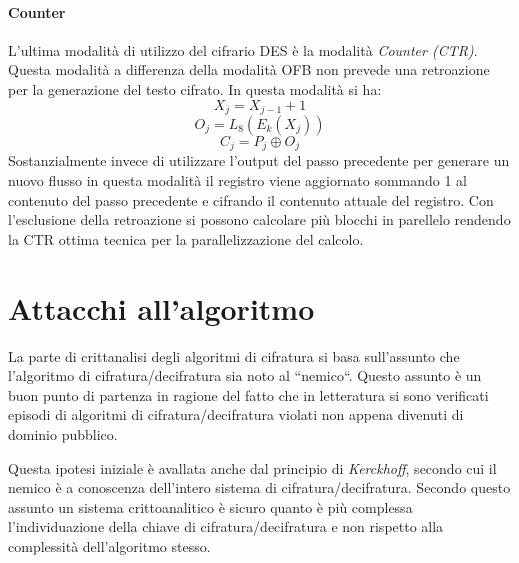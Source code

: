 \documentclass[11pt, a4paper, oneside]{Thesis} %
\begin{document}
\paragraph{Counter} L'ultima modalità di utilizzo del cifrario DES è la modalità \textit{Counter (CTR)}. Questa modalità a differenza della modalità OFB non prevede una retroazione
per la generazione del testo cifrato. In questa modalità si ha:
\[ X_j = X_{j-1}+1 \]
\[ O_j = L_8(E_k(X_j))\]
\[ C_j = P_j \oplus O_j\]
Sostanzialmente invece di utilizzare l'output del passo precedente per generare un nuovo flusso in questa modalità il registro viene aggiornato sommando 1 al contenuto
del passo precedente e cifrando il contenuto attuale del registro. Con l'esclusione della retroazione si possono calcolare più blocchi in parellelo rendendo la CTR 
ottima tecnica per la parallelizzazione del calcolo.

\section{Attacchi all'algoritmo}
La parte di crittanalisi degli algoritmi di cifratura si basa sull'assunto che l'algoritmo di cifratura/decifratura sia noto al ``nemico``. Questo assunto è un buon punto di partenza
in ragione del fatto che in letteratura si sono verificati episodi di algoritmi di cifratura/decifratura violati non appena divenuti di dominio pubblico.
\par Questa ipotesi iniziale è avallata anche dal principio di \textit{Kerckhoff}, secondo cui il nemico è a conoscenza dell'intero sistema di cifratura/decifratura.
Secondo questo assunto un sistema crittoanalitico è sicuro quanto è più complessa l'individuazione della chiave di cifratura/decifratura e non rispetto alla complessità dell'algoritmo stesso.
\end{document}
